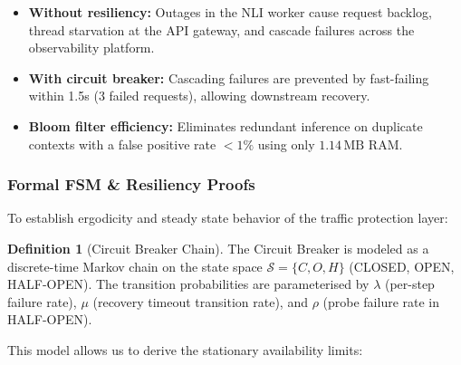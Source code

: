 \documentclass[11pt,a4paper]{article}
\theoremstyle{plain}
\theoremstyle{definition}
\newtheorem{definition}[theorem]{Definition}
\theoremstyle{remark}
\begin{document}
\begin{impbox}
\begin{itemize}[nosep,leftmargin=1.2em]
  \item \textbf{Without resiliency:} Outages in the NLI worker cause request backlog, thread starvation at the API gateway, and cascade failures across the observability platform.
  \item \textbf{With circuit breaker:} Cascading failures are prevented by fast-failing within 1.5s (3 failed requests), allowing downstream recovery.
  \item \textbf{Bloom filter efficiency:} Eliminates redundant inference on duplicate contexts with a false positive rate $<1\%$ using only $1.14\,\mathrm{MB}$ RAM.
\end{itemize}
\end{impbox}

\subsubsection{Formal FSM \& Resiliency Proofs}

To establish ergodicity and steady state behavior of the traffic protection layer:

\begin{definition}[Circuit Breaker Chain]\label{def:cb}
The Circuit Breaker is modeled as a discrete-time Markov chain on the state space $\mathcal{S} = \{C, O, H\}$ (CLOSED, OPEN, HALF-OPEN). The transition probabilities are parameterised by $\lambda$ (per-step failure rate), $\mu$ (recovery timeout transition rate), and $\rho$ (probe failure rate in HALF-OPEN).
\end{definition}

This model allows us to derive the stationary availability limits:
\end{document}
